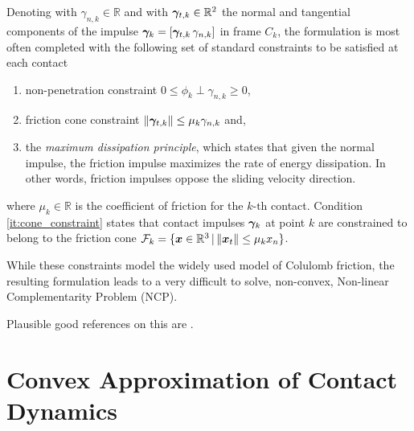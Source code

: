 Denoting with $\gamma_{n,k} \in \mathbb{R}$ and with ${\bm\gamma}_{t,k} \in
\mathbb{R}^2$ the normal and tangential components of the impulse
${\bm\gamma}_k=[{\bm\gamma}_{t,k}\,\gamma_{n,k}]$ in frame $C_k$, the formulation is
most often completed with the following set of standard constraints to be
satisfied at each contact
\begin{enumerate}
	\item non-penetration constraint $0\le\phi_k\perp\gamma_{n,k}\ge0$,
	\item\label{it:cone_constraint} friction cone constraint
	$\Vert{\bm\gamma}_{t,k}\Vert\le \mu_k\gamma_{n,k}$ and,
	\item the \emph{maximum dissipation principle}, which states that given the
	normal impulse, the friction impulse maximizes the rate of energy
	dissipation. In other words, friction impulses oppose the sliding velocity
	direction.
\end{enumerate}
where $\mu_k \in \mathbb{R}$ is the coefficient of friction for the $k\text{-th}$ contact.
Condition \ref{it:cone_constraint} states that contact impulses ${\bm\gamma}_k$ at point $k$ are
constrained to belong to the friction cone
$\mathcal{F}_k=\{{\bm{x}}\in\mathbb{R}^3 \,|\, \Vert{\bm{x}}_t\Vert\le \mu_k x_n\}$.

While these constraints model the widely used model of Colulomb friction, the
resulting formulation leads to a very difficult to solve, non-convex, Non-linear
Complementarity Problem (NCP). 



Plausible good references on this are
\cite{bib:stewart1996implicit,bib:stewart2000implicit,bib:chakraborty2007implicit,bib:acary2018solving,bib:pang1999unified,bib:alart2018inconsistency}.

\section{Convex Approximation of Contact Dynamics}
\label{sec:previous_work}

